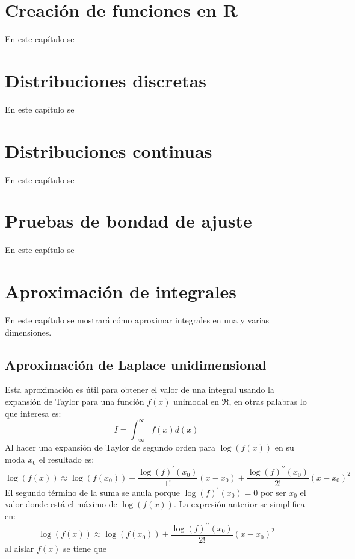 \documentclass[10pt,]{krantz}
\let\proglang=\textsf
\begin{document}
\chapter{\texorpdfstring{Creación de funciones en
\proglang{R}}{Creación de funciones en }}\label{creacion-de-funciones-en}

En este capítulo se

\chapter{Distribuciones discretas}\label{distribuciones-discretas}

En este capítulo se

\chapter{Distribuciones continuas}\label{distribuciones-continuas}

En este capítulo se

\chapter{Pruebas de bondad de ajuste}\label{pruebas-de-bondad-de-ajuste}

En este capítulo se

\chapter{Aproximación de integrales}\label{aproximacion-de-integrales}

En este capítulo se mostrará cómo aproximar integrales en una y varias
dimensiones.

\section{Aproximación de Laplace
unidimensional}\label{aproximacion-de-laplace-unidimensional}

Esta aproximación es útil para obtener el valor de una integral usando
la expansión de Taylor para una función \(f(x)\) unimodal en \(\Re\), en
otras palabras lo que interesa es:
\[ I = \int_{-\infty}^{\infty} f(x) d(x)\] Al hacer una expansión de
Taylor de segundo orden para \(\log(f(x))\) en su moda \(x_0\) el
resultado es:
\[ \log(f(x)) \approx \log(f(x_0)) + \frac{\log(f)^\prime(x_0)}{1!} (x-x_0) + \frac{\log(f)^{\prime \prime}(x_0)}{2!} (x-x_0)^2 \]
El segundo término de la suma se anula porque \(\log(f)^\prime(x_0)=0\)
por ser \(x_0\) el valor donde está el máximo de \(\log(f(x))\). La
expresión anterior se simplifica en:
\[ \log(f(x)) \approx \log(f(x_0)) + \frac{\log(f)^{\prime \prime}(x_0)}{2!} (x-x_0)^2 \]
al aislar \(f(x)\) se tiene que
\end{document}
